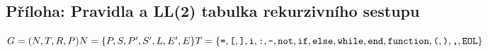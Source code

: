 \documentclass[12pt,a4paper,titlepage,final]{article}
\begin{document}
\begin{landscape} %
\section{Příloha: Pravidla a LL(2) tabulka rekurzivního sestupu} \label{rekurzivnisestup}

\begin{minipage}{\linewidth} %
\begin{large}

\begin{math}
G = (N,T,R,P) \\
N = \{ P, S, P', S', L, E', E \} \\
T = \{ \texttt{=}, \texttt{[}, \texttt{]}, \texttt{i}, \texttt{:}, \texttt{-}, \texttt{not}, \texttt{if}, \texttt{else}, \texttt{while}, \texttt{end}, \texttt{function}, \texttt{(}, \texttt{)}, \texttt{,}, \texttt{EOL} \} \\
\end{math}


\end{large}
\end{minipage}
\end{landscape}
\end{document}
